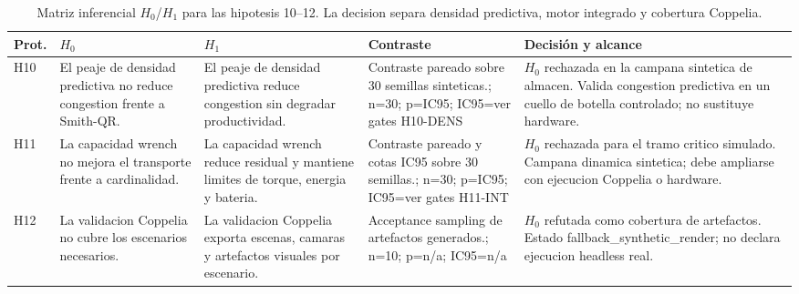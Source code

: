 \begin{table}[H]
\centering
\caption{Matriz inferencial $H_0$/$H_1$ para las hipotesis 10--12. La decision separa densidad predictiva, motor integrado y cobertura Coppelia.}
\label{tab:hypothesis-decision-base-d}
\scriptsize
\begin{tabularx}{\textwidth}{@{}>{\raggedright\arraybackslash}p{}>{\raggedright\arraybackslash}p{}>{\raggedright\arraybackslash}p{}>{\raggedright\arraybackslash}p{}>{\raggedright\arraybackslash}X@{}}
\toprule
Prot. & $H_0$ & $H_1$ & Contraste & Decisión y alcance \\
\midrule
H10 & El peaje de densidad predictiva no reduce congestion frente a Smith-QR. & El peaje de densidad predictiva reduce congestion sin degradar productividad. & Contraste pareado sobre 30 semillas sinteticas.; n=30; p=IC95; IC95=ver gates H10-DENS & $H_0$ rechazada en la campana sintetica de almacen. Valida congestion predictiva en un cuello de botella controlado; no sustituye hardware. \\
H11 & La capacidad wrench no mejora el transporte frente a cardinalidad. & La capacidad wrench reduce residual y mantiene limites de torque, energia y bateria. & Contraste pareado y cotas IC95 sobre 30 semillas.; n=30; p=IC95; IC95=ver gates H11-INT & $H_0$ rechazada para el tramo critico simulado. Campana dinamica sintetica; debe ampliarse con ejecucion Coppelia o hardware. \\
H12 & La validacion Coppelia no cubre los escenarios necesarios. & La validacion Coppelia exporta escenas, camaras y artefactos visuales por escenario. & Acceptance sampling de artefactos generados.; n=10; p=n/a; IC95=n/a & $H_0$ refutada como cobertura de artefactos. Estado fallback\_synthetic\_render; no declara ejecucion headless real. \\
\bottomrule
\end{tabularx}
\end{table}

